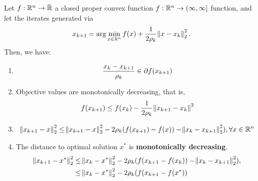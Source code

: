 \begin{refsection}
\begin{theorem}\cite[236]{bertsekas2015convex}
Let $f:\mathbb{R}^n \to \bar{\mathbb{R}}$ a closed proper convex function $f:\mathbb{R}^n\to (\infty,\infty]$ function, and let the iterates generated via
	$$x_{k+1} = \arg\min_{x\in \mathbb{R}^n} f(x) + \frac{1}{2\rho_k}\norm{x-x_k}^2_2.$$
Then, we have:
\begin{enumerate}
	\item $$\frac{x_k-x_{k+1}}{\rho_k} \in  \partial f(x_{k+1})$$
	\item Objective values are monotonically decreasing, that is,  $$f(x_{k+1}) \leq f(x_k) -\frac{1}{2\rho_k}\norm{x_{k+1}-x_k}^2 $$
	\item $$\norm{x_{k+1}-x}_2^2 \leq \norm{x_{k+1}-x}_2^2 -2\rho_k(f(x_{k+1})-f(x)) - \norm{x_{k}-x_{k+1}}_2^2),\forall x\in \mathbb{R}^n$$
	\item The distance to optimal solution $x^*$ is \textbf{monotonically decreasing}.
	\begin{align*}
	\norm{x_{k+1}-x^*}_2^2 & \leq \norm{x_{k}-x^*}_2^2 -2\rho_k(f(x_{k+1}-f(x_k)) - \norm{x_{k}-x_{k+1}}_2^2),\\
	& \leq \norm{x_{k}-x^*}_2^2 -2\rho_k(f(x_{k+1}-f(x^*))
	\end{align*}


\end{enumerate}
\end{theorem}
\end{refsection}
